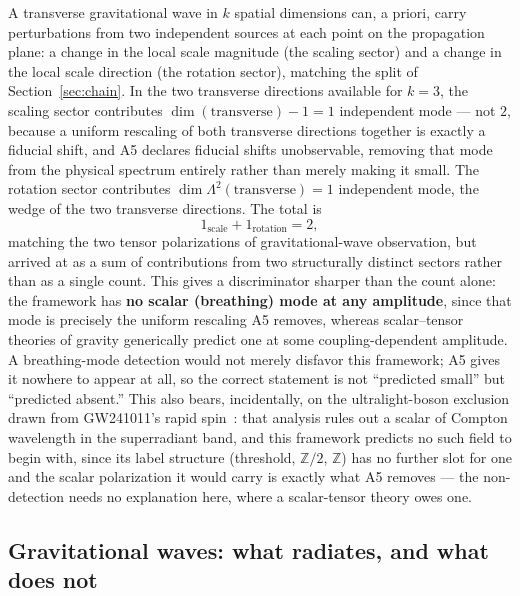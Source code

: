 \documentclass[pdflatex,sn-mathphys-num]{sn-jnl}
\theoremstyle{thmstyleone}
\theoremstyle{thmstylethree}
\theoremstyle{thmstyletwo}
\begin{document}
A transverse gravitational wave in $k$ spatial dimensions can, a priori,
carry perturbations from two independent sources at each point on the
propagation plane: a change in the local scale magnitude (the scaling
sector) and a change in the local scale direction (the rotation sector),
matching the split of Section~\ref{sec:chain}. In the two transverse
directions available for $k=3$, the scaling sector contributes
$\dim(\text{transverse}) - 1 = 1$ independent mode — not $2$, because a
uniform rescaling of both transverse directions together is exactly a
fiducial shift, and A5 declares fiducial shifts unobservable, removing
that mode from the physical spectrum entirely rather than merely making
it small. The rotation sector contributes $\dim\Lambda^2(\text{transverse}) = 1$
independent mode, the wedge of the two transverse directions. The total
is
\begin{equation}
1_{\text{scale}} + 1_{\text{rotation}} = 2,
\end{equation}
matching the two tensor polarizations of gravitational-wave observation,
but arrived at as a sum of contributions from two structurally distinct
sectors rather than as a single count. This gives a discriminator sharper
than the count alone: the framework has \textbf{no scalar (breathing)
mode at any amplitude}, since that mode is precisely the uniform
rescaling A5 removes, whereas scalar–tensor theories of gravity generically
predict one at some coupling-dependent amplitude. A breathing-mode
detection would not merely disfavor this framework; A5 gives it nowhere
to appear at all, so the correct statement is not ``predicted small'' but
``predicted absent.'' This also bears, incidentally, on the ultralight-boson
exclusion drawn from GW241011's rapid spin~\cite{GW241011}: that analysis
rules out a scalar of Compton wavelength in the superradiant band, and this
framework predicts no such field to begin with, since its label structure
(threshold, $\mathbb{Z}/2$, $\mathbb{Z}$) has no further slot for one and the
scalar polarization it would carry is exactly what A5 removes — the
non-detection needs no explanation here, where a scalar-tensor theory owes one.

\subsection{Gravitational waves: what radiates, and what does not}
\end{document}
